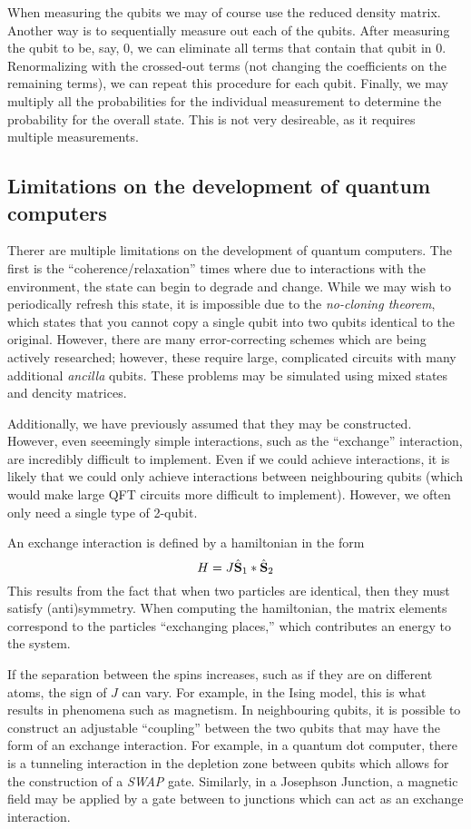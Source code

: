 When measuring the qubits we may of course use the reduced density matrix. Another way is to sequentially measure out each of the qubits. After measuring the qubit to be, say, \(0\), we can eliminate all terms that contain that qubit in \(0\). Renormalizing with the crossed-out terms (not changing the coefficients on the remaining terms), we can repeat this procedure for each qubit. Finally, we may multiply all the probabilities for the individual measurement to determine the probability for the overall state. This is not very desireable, as it requires multiple measurements.

\subsection{Limitations on the development of quantum computers}
Therer are multiple limitations on the development of quantum computers. The first is the ``coherence/relaxation'' times where due to interactions with the environment, the state can begin to degrade and change. While we may wish to periodically refresh this state, it is impossible due to the \emph{no-cloning theorem}, which states that you cannot copy a single qubit into two qubits identical to the original. However, there are many error-correcting schemes which are being actively researched; however, these require large, complicated circuits with many additional \emph{ancilla} qubits. These problems may be simulated using mixed states and dencity matrices.

Additionally, we have previously assumed that they may be constructed. However, even seeemingly simple interactions, such as the ``exchange'' interaction, are incredibly difficult to implement. Even if we could achieve interactions, it is likely that we could only achieve interactions between neighbouring qubits (which would make large QFT circuits more difficult to implement). However, we often only need a single type of 2-qubit.
\begin{aside}
	An exchange interaction is defined by a hamiltonian in the form
	\[H = J\hat {\mathbf{S}}_1*\hat{\mathbf{S}}_2\]
	This results from the fact that when two particles are identical, then they must satisfy (anti)symmetry. When computing the hamiltonian, the matrix elements correspond to the particles ``exchanging places,'' which contributes an energy to the system.

	If the separation between the spins increases, such as if they are on different atoms, the sign of \(J\) can vary. For example, in the Ising model, this is what results in phenomena such as magnetism. In neighbouring qubits, it is possible to construct an adjustable ``coupling'' between the two qubits that may have the form of an exchange interaction. For example, in a quantum dot computer, there is a tunneling interaction in the depletion zone between qubits which allows for the construction of a \emph{SWAP} gate. Similarly, in a Josephson Junction, a magnetic field may be applied by a gate between to junctions which can act as an exchange interaction.
\end{aside}

